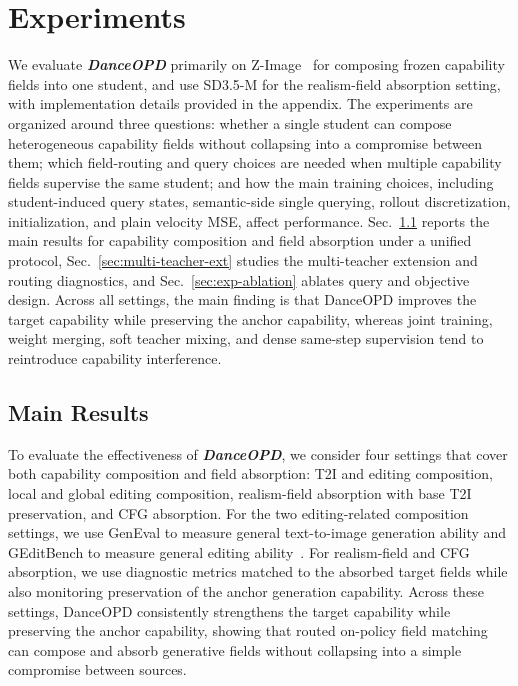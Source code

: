\documentclass{llmxive}
\providecommand{\name}{\textsl{\textbf{DanceOPD}}\xspace}
\begin{document}
\section{Experiments}
\label{sec:experiments}

We evaluate \name{} primarily on Z-Image~\cite{cai2025z} for composing frozen capability fields into one student, and use SD3.5-M for the realism-field absorption setting, with implementation details provided in the appendix. The experiments are organized around three questions: whether a single student can compose heterogeneous capability fields without collapsing into a compromise between them; which field-routing and query choices are needed when multiple capability fields supervise the same student; and how the main training choices, including student-induced query states, semantic-side single querying, rollout discretization, initialization, and plain velocity MSE, affect performance. Sec.~\ref{sec:main-results} reports the main results for capability composition and field absorption under a unified protocol, Sec.~\ref{sec:multi-teacher-ext} studies the multi-teacher extension and routing diagnostics, and Sec.~\ref{sec:exp-ablation} ablates query and objective design. Across all settings, the main finding is that DanceOPD improves the target capability while preserving the anchor capability, whereas joint training, weight merging, soft teacher mixing, and dense same-step supervision tend to reintroduce capability interference. 


\subsection{Main Results}
\label{sec:main-results}

To evaluate the effectiveness of \name{}, we consider four settings that cover both capability composition and field absorption: T2I and editing composition, local and global editing composition, realism-field absorption with base T2I preservation, and CFG absorption. For the two editing-related composition settings, we use GenEval to measure general text-to-image generation ability and GEditBench to measure general editing ability~\cite{ghosh2023geneval,liu2025step1x}. For realism-field and CFG absorption, we use diagnostic metrics matched to the absorbed target fields while also monitoring preservation of the anchor generation capability. Across these settings, DanceOPD consistently strengthens the target capability while preserving the anchor capability, showing that routed on-policy field matching can compose and absorb generative fields without collapsing into a simple compromise between sources.
\end{document}
